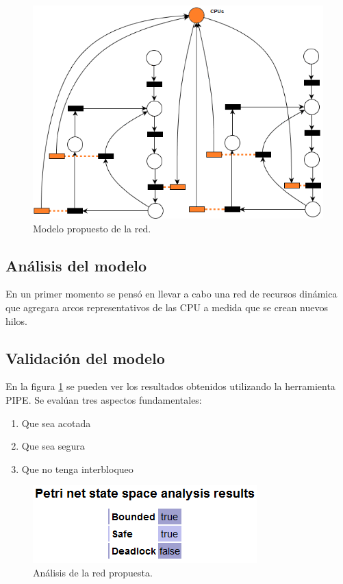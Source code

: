 \documentclass[a4paper]{book}
\begin{document}
\begin{figure} [H]
	\begin{center}
	    \includegraphics[scale=0.8]{./imagenes/it2modelored.png}
		\caption{Modelo propuesto de la red.}
	\end{center}
\end{figure}

\subsection{An\'alisis del modelo}
En un primer momento se pens\'o en llevar a cabo una red de recursos din\'amica que agregara arcos representativos de las CPU a medida que se crean nuevos hilos.

\subsection{Validaci\'on del modelo}
En la figura \ref{Fig:validacion2} se pueden ver los resultados obtenidos utilizando la herramienta PIPE. Se eval\'uan tres aspectos fundamentales:
\begin{enumerate}
\item Que sea acotada
\item Que sea segura
\item Que no tenga interbloqueo
\end{enumerate}

\begin{figure} [H]
	\begin{center}
        \includegraphics[scale=0.7]{./imagenes/it2validacion.png}
		\caption{An\'alisis de la red propuesta.}
		\label{Fig:validacion2}
	\end{center}
\end{figure}
\end{document}

